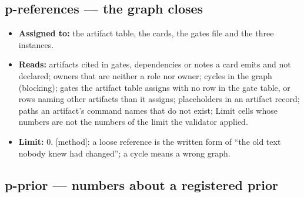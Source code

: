 \documentclass[
  american,
  10pt,
]{report}
\providecommand{\tightlist}{%
  \setlength{\itemsep}{0pt}\setlength{\parskip}{0pt}}
\renewcommand{\texttt}[1]{{\ttfamily\hyphenchar\font=-1 #1}}
\begin{document}
\subsection{\texorpdfstring{\texttt{p-\allowbreak{}references} --- the
graph
closes}{ --- the graph closes}}\label{p-references-the-graph-closes}

\begin{itemize}
\tightlist
\item
  \textbf{Assigned to:} the artifact table, the cards, the gates file
  and the three instances.
\item
  \textbf{Reads:} artifacts cited in gates, dependencies or notes a card
  emits and not declared; owners that are neither a role nor
  \texttt{owner}; cycles in the graph (blocking); gates the artifact
  table assigns with no row in the gate table, or rows naming other
  artifacts than it assigns; placeholders in an artifact record; paths
  an artifact's \texttt{command} names that do not exist; Limit cells
  whose numbers are not the numbers of the limit the validator applied.
\item
  \textbf{Limit:} 0. \texttt{[method]}: a loose reference is the written
  form of ``the old text nobody knew had changed''; a cycle means a
  wrong graph.
\end{itemize}

\subsection{\texorpdfstring{\texttt{p-\allowbreak{}prior} --- numbers
about a registered
prior}{ --- numbers about a registered prior}}\label{p-prior-numbers-about-a-registered-prior}
\end{document}
